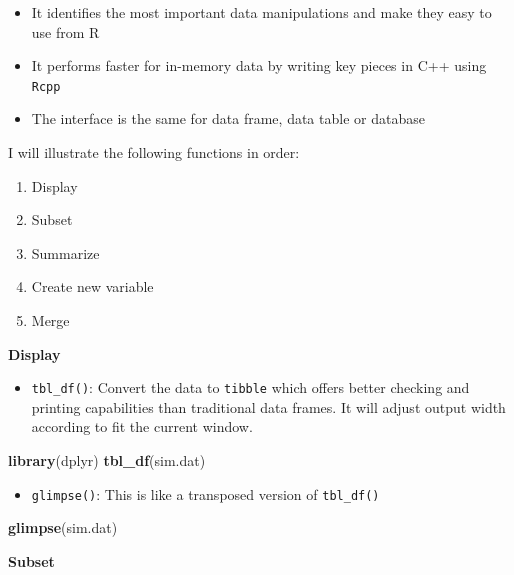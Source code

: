 \documentclass[]{book}
\newenvironment{Shaded}{\begin{snugshade}}{\end{snugshade}}
\newcommand{\KeywordTok}[1]{\textcolor[rgb]{0.13,0.29,0.53}{\textbf{{#1}}}}
\newcommand{\NormalTok}[1]{{#1}}
\providecommand{\tightlist}{%
  \setlength{\itemsep}{0pt}\setlength{\parskip}{0pt}}
\theoremstyle{definition}
\theoremstyle{definition}
\theoremstyle{remark}
\begin{document}
\begin{itemize}
\tightlist
\item
  It identifies the most important data manipulations and make they easy
  to use from R
\item
  It performs faster for in-memory data by writing key pieces in C++
  using \texttt{Rcpp}
\item
  The interface is the same for data frame, data table or database
\end{itemize}

I will illustrate the following functions in order:

\begin{enumerate}
\def\labelenumi{\arabic{enumi}.}
\tightlist
\item
  Display
\item
  Subset
\item
  Summarize
\item
  Create new variable
\item
  Merge
\end{enumerate}

\textbf{Display}

\begin{itemize}
\tightlist
\item
  \texttt{tbl\_df()}: Convert the data to \texttt{tibble} which offers
  better checking and printing capabilities than traditional data
  frames. It will adjust output width according to fit the current
  window.
\end{itemize}

\begin{Shaded}
\begin{Highlighting}[]
\KeywordTok{library}\NormalTok{(dplyr)}
\KeywordTok{tbl_df}\NormalTok{(sim.dat)}
\end{Highlighting}
\end{Shaded}

\begin{itemize}
\tightlist
\item
  \texttt{glimpse()}: This is like a transposed version of
  \texttt{tbl\_df()}
\end{itemize}

\begin{Shaded}
\begin{Highlighting}[]
\KeywordTok{glimpse}\NormalTok{(sim.dat)}
\end{Highlighting}
\end{Shaded}

\textbf{Subset}
\end{document}
